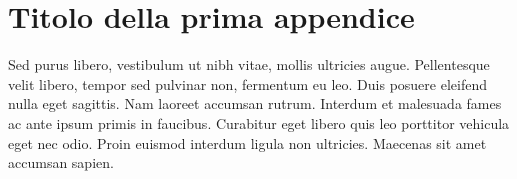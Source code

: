 \documentclass[target=mst,aauheader=aics,style=]{thud}
\begin{document}

















\appendix


\chapter{Titolo della prima appendice}
Sed purus libero, vestibulum ut nibh vitae, mollis ultricies augue. Pellentesque velit libero, tempor sed pulvinar non, fermentum eu leo. Duis posuere eleifend nulla eget sagittis. Nam laoreet accumsan rutrum. Interdum et malesuada fames ac ante ipsum primis in faucibus. Curabitur eget libero quis leo porttitor vehicula eget nec odio. Proin euismod interdum ligula non ultricies. Maecenas sit amet accumsan sapien.

\backmatter




\end{document}
